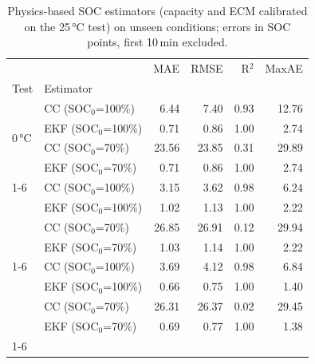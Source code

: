 \begin{table}[htbp]\centering\footnotesize
\begin{tabular}{llrrrr}
\toprule
 &  & MAE & RMSE & R$^2$ & MaxAE \\
Test & Estimator &  &  &  &  \\
\midrule
\multirow[t]{4}{*}{0\,°C} & CC (SOC$_0$=100\%) & 6.44 & 7.40 & 0.93 & 12.76 \\
 & EKF (SOC$_0$=100\%) & 0.71 & 0.86 & 1.00 & 2.74 \\
 & CC (SOC$_0$=70\%) & 23.56 & 23.85 & 0.31 & 29.89 \\
 & EKF (SOC$_0$=70\%) & 0.71 & 0.86 & 1.00 & 2.74 \\
\cline{1-6}
\multirow[t]{4}{*}{45\,°C} & CC (SOC$_0$=100\%) & 3.15 & 3.62 & 0.98 & 6.24 \\
 & EKF (SOC$_0$=100\%) & 1.02 & 1.13 & 1.00 & 2.22 \\
 & CC (SOC$_0$=70\%) & 26.85 & 26.91 & 0.12 & 29.94 \\
 & EKF (SOC$_0$=70\%) & 1.03 & 1.14 & 1.00 & 2.22 \\
\cline{1-6}
\multirow[t]{4}{*}{1\,A} & CC (SOC$_0$=100\%) & 3.69 & 4.12 & 0.98 & 6.84 \\
 & EKF (SOC$_0$=100\%) & 0.66 & 0.75 & 1.00 & 1.40 \\
 & CC (SOC$_0$=70\%) & 26.31 & 26.37 & 0.02 & 29.45 \\
 & EKF (SOC$_0$=70\%) & 0.69 & 0.77 & 1.00 & 1.38 \\
\cline{1-6}
\bottomrule
\end{tabular}
\caption{Physics-based SOC estimators (capacity and ECM calibrated on the 25\,°C test) on unseen conditions; errors in SOC points, first 10\,min excluded.}\label{tab:socphys}
\end{table}
